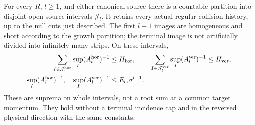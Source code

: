 \begin{theorem}
\label{thm:cs-half-sup}
For every $R$, $l\ge1$, and either canonical source there is a
countable partition into disjoint open source intervals $\mathcal J_l$.
It retains every actual regular collision history, up to the null
cuts just described.  The first $l-1$ images are homogeneous and
short according to the growth partition; the terminal image is not
artificially divided into infinitely many strips.  On these intervals,
\begin{align}
 \sum_{I\in\mathcal J_l^{\rm hor}}
                 \sup_I(A_l^{\rm hor})^{-1}&\le H_{\rm hor},&
 \sum_{I\in\mathcal J_l^{\rm ver}}
                 \sup_I(A_l^{\rm ver})^{-1}&\le H_{\rm ver},
                                                        \label{eq:cs-half-sums}\\
 \sup_I(A_l^{\rm hor})^{-1},\quad
 \sup_I(A_l^{\rm ver})^{-1}
                  &\le E_{\rm cs}\sigma^{l-1}.\notag
\end{align}
These are suprema on whole intervals, not a root sum at a common
target momentum.  They hold without a terminal incidence cap and
in the reversed physical direction with the same constants.
\end{theorem}
